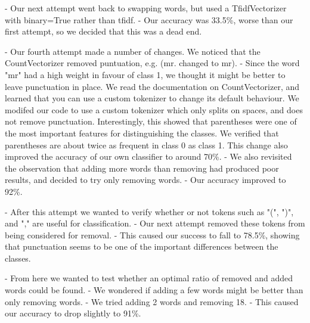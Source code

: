 \documentclass{article}
\begin{document}
 - Our next attempt went back to swapping words, but used a TfidfVectorizer with binary=True rather than tfidf.
 - Our accuracy was 33.5\%, worse than our first attempt, so we decided that this was a dead end.

 - Our fourth attempt made a number of changes. We noticed that the CountVectorizer removed puntuation, e.g. (mr. changed to mr).
 - Since the word "mr" had a high weight in favour of class 1, we thought it might be better to leave punctuation in place. We read the documentation on CountVectorizer, and learned that you can use a custom tokenizer to change its default behaviour. We modifed our code to use a custom tokenizer which only splits on spaces, and does not remove punctuation. Interestingly, this showed that parentheses were one of the most important features for distinguishing the classes. We verified that parentheses are about twice as frequent in class 0 as class 1. This change also improved the accuracy of our own classifier to around 70\%.
 - We also revisited the observation that adding more words than removing had produced poor results, and decided to try only removing words.
 - Our accuracy improved to 92\%.

 - After this attempt we wanted to verify whether or not tokens such as "(", ")", and "," are useful for classification.
 - Our next attempt removed these tokens from being considered for removal.
 - This caused our success to fall to 78.5\%, showing that punctuation seems to be one of the important differences between the classes.

 - From here we wanted to test whether an optimal ratio of removed and added words could be found.
 - We wondered if adding a few words might be better than only removing words. 
 - We tried adding 2 words and removing 18. 
 - This caused our accuracy to drop slightly to 91\%. \\


\end{document}
